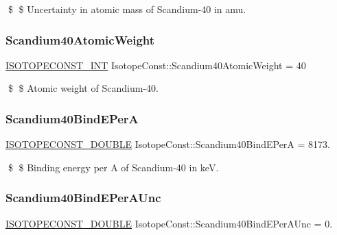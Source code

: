 \$ \$ Uncertainty in atomic mass of Scandium-\/40 in amu. \mbox{\label{group___isotope_const-_scandium-_sc40_ga13f6c17bfdcdc43cb1f3f0ed70a4fe5d}} 
\subsubsection{\texorpdfstring{Scandium40\+Atomic\+Weight}{Scandium40AtomicWeight}}
{\footnotesize\ttfamily \mbox{\hyperlink{group___isotope_const-_macros_ga5f18360b3e99483a35c32d789e62621c}{I\+S\+O\+T\+O\+P\+E\+C\+O\+N\+S\+T\+\_\+\+I\+NT}} Isotope\+Const\+::\+Scandium40\+Atomic\+Weight = 40}

\$ \$ Atomic weight of Scandium-\/40. \mbox{\label{group___isotope_const-_scandium-_sc40_ga39f4392b4b17590ea707370132e30479}} 
\subsubsection{\texorpdfstring{Scandium40\+Bind\+E\+PerA}{Scandium40BindEPerA}}
{\footnotesize\ttfamily \mbox{\hyperlink{group___isotope_const-_macros_ga8f45a7272ce02c0b4c65c44636ed719a}{I\+S\+O\+T\+O\+P\+E\+C\+O\+N\+S\+T\+\_\+\+D\+O\+U\+B\+LE}} Isotope\+Const\+::\+Scandium40\+Bind\+E\+PerA = 8173.}

\$ \$ Binding energy per A of Scandium-\/40 in keV. \mbox{\label{group___isotope_const-_scandium-_sc40_ga1b501922017b44e3698e9bab6631ce20}} 
\subsubsection{\texorpdfstring{Scandium40\+Bind\+E\+Per\+A\+Unc}{Scandium40BindEPerAUnc}}
{\footnotesize\ttfamily \mbox{\hyperlink{group___isotope_const-_macros_ga8f45a7272ce02c0b4c65c44636ed719a}{I\+S\+O\+T\+O\+P\+E\+C\+O\+N\+S\+T\+\_\+\+D\+O\+U\+B\+LE}} Isotope\+Const\+::\+Scandium40\+Bind\+E\+Per\+A\+Unc = 0.}

